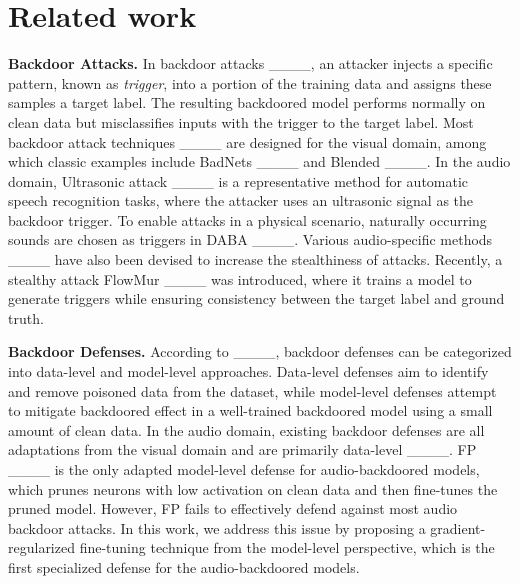 \section{Related work}
\noindent \textbf{Backdoor Attacks. }In backdoor attacks ____, an attacker injects a specific pattern, known as \textit{trigger}, into a portion of the training data and assigns these samples a target label. The resulting backdoored model performs normally on clean data but misclassifies inputs with the trigger to the target label. Most backdoor attack techniques ____ are designed for the visual domain, among which classic examples include BadNets ____ and Blended ____. In the audio domain, Ultrasonic attack ____ is a representative method for automatic speech recognition tasks, where the attacker uses an ultrasonic signal as the backdoor trigger. To enable attacks in a physical scenario, naturally occurring sounds are chosen as triggers in DABA ____. Various audio-specific methods ____ have also been devised to increase the stealthiness of attacks. Recently, a stealthy attack FlowMur ____ was introduced, where it trains a model to generate triggers while ensuring consistency between the target label and ground truth.

\noindent \textbf{Backdoor Defenses. }According to ____, backdoor defenses can be categorized into data-level and model-level approaches. Data-level defenses aim to identify and remove poisoned data from the dataset, while model-level defenses attempt to mitigate backdoored effect in a well-trained backdoored model using a small amount of clean data. In the audio domain, existing backdoor defenses are all adaptations from the visual domain and are primarily data-level ____. FP ____ is the only adapted model-level defense for audio-backdoored models, which prunes neurons with low activation on clean data and then fine-tunes the pruned model. However, FP fails to effectively defend against most audio backdoor attacks. In this work, we address this issue by proposing a gradient-regularized fine-tuning technique from the model-level perspective, which is the first specialized defense for the audio-backdoored models. 


